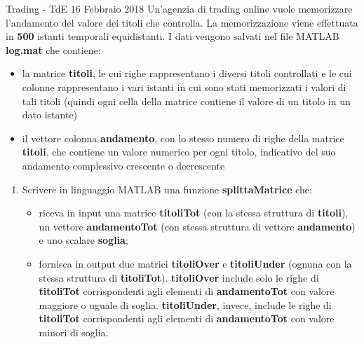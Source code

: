 \documentclass[aspectratio=169, ]{beamer}
\begin{document}
\begin{frame}[allowframebreaks]{Trading - TdE 16 Febbraio 2018}
    Un’agenzia di trading online vuole memorizzare l’andamento del valore dei titoli che controlla.
    La memorizzazione viene effettuata in \textbf{500} istanti temporali equidistanti.
    I dati vengono salvati nel file MATLAB \textbf{log.mat} che contiene:
    \begin{itemize}
        \item la matrice \textbf{titoli}, le cui righe rappresentano i diversi titoli controllati e le cui colonne rappresentano i vari istanti in cui sono stati memorizzati i valori di tali titoli (quindi ogni cella della matrice contiene il valore di un titolo in un dato istante)
        \item il vettore colonna \textbf{andamento}, con lo stesso numero di righe della matrice \textbf{titoli}, che contiene un valore numerico per ogni titolo, indicativo del suo andamento complessivo crescente o decrescente
    \end{itemize}

    \framebreak
    \begin{enumerate}
        \item Scrivere in linguaggio MATLAB una funzione \textbf{splittaMatrice} che:
            \begin{itemize}
                \item riceva in input una matrice \textbf{titoliTot} (con la stessa struttura di \textbf{titoli}), un vettore \textbf{andamentoTot} (con stessa struttura di vettore \textbf{andamento}) e uno scalare \textbf{soglia};
                \item fornisca in output due matrici \textbf{titoliOver} e \textbf{titoliUnder} (ognuna con la stessa struttura di \textbf{titoliTot}). \textbf{titoliOver} include solo le righe di \textbf{titoliTot} corrispondenti agli elementi di \textbf{andamentoTot} con valore maggiore o uguale di soglia. \textbf{titoliUnder}, invece, include le righe di \textbf{titoliTot} corrispondenti agli elementi di \textbf{andamentoTot} con valore minori di soglia.
            \end{itemize}


\end{enumerate}
\end{frame}
\end{document}
